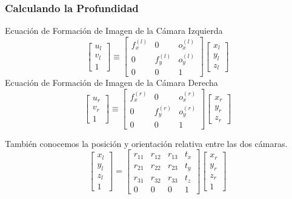 \begin{frame}
    \frametitle{Calculando la Profundidad}
    Ecuación de Formación de Imagen de la Cámara Izquierda
    $$
    \begin{bmatrix} u_l \\ v_l \\ 1 \end{bmatrix} \equiv
    \begin{bmatrix}
        f_x^{(l)} & 0 & o_x^{(l)} \\
        0 & f_y^{(l)} & o_y^{(l)} \\
        0 & 0 & 1
    \end{bmatrix}
    \begin{bmatrix} x_l \\ y_l \\ z_l \end{bmatrix}
    $$
    Ecuación de Formación de Imagen de la Cámara Derecha
    $$
    \begin{bmatrix} u_r \\ v_r \\ 1 \end{bmatrix} \equiv
    \begin{bmatrix}
        f_x^{(r)} & 0 & o_x^{(r)} \\
        0 & f_y^{(r)} & o_y^{(r)} \\
        0 & 0 & 1
    \end{bmatrix}
    \begin{bmatrix} x_r \\ y_r \\ z_r \end{bmatrix}
    $$

    También conocemos la posición y orientación relativa entre las dos cámaras.
    $$
    \begin{bmatrix} x_l \\ y_l \\ z_l \\ 1 \end{bmatrix} =
    \begin{bmatrix}
        r_{11} & r_{12} & r_{13} & t_x \\
        r_{21} & r_{22} & r_{23} & t_y \\
        r_{31} & r_{32} & r_{33} & t_z \\
        0 & 0 & 0 & 1
    \end{bmatrix}
    \begin{bmatrix} x_r \\ y_r \\ z_r \\ 1 \end{bmatrix}
    $$
\end{frame}

